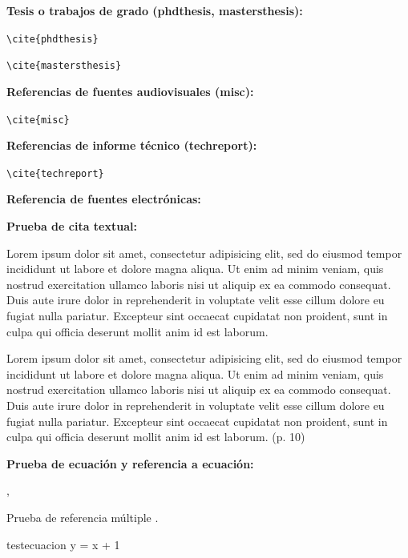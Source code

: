 \espaciodoble\textbf{Tesis o trabajos de grado (phdthesis, mastersthesis):}

\verb;\cite{phdthesis}; \cite{phdthesis}

\verb;\cite{mastersthesis}; \cite{mastersthesis}

\espaciodoble\textbf{Referencias de fuentes audiovisuales (misc):}

\verb;\cite{misc}; \cite{misc}

\espaciodoble\textbf{Referencias de informe técnico (techreport):}

\verb;\cite{techreport}; \cite{techreport}

\espaciodoble\textbf{Referencia de fuentes electrónicas:}

\cite{causa2007computacion}

\break

\espaciodoble\textbf{Prueba de cita textual:}

Lorem ipsum dolor sit amet, consectetur adipisicing elit, sed do eiusmod tempor incididunt ut labore et dolore magna aliqua. Ut enim ad minim veniam, quis nostrud exercitation ullamco laboris nisi ut aliquip ex ea commodo consequat. Duis aute irure dolor in reprehenderit in voluptate velit esse cillum dolore eu fugiat nulla pariatur. Excepteur sint occaecat cupidatat non proident, sunt in culpa qui officia deserunt mollit anim id est laborum.

\begin{citatextual}
Lorem ipsum dolor sit amet, consectetur adipisicing elit, sed do eiusmod tempor incididunt ut labore et dolore magna aliqua. Ut enim ad minim veniam, quis nostrud exercitation ullamco laboris nisi ut aliquip ex ea commodo consequat. Duis aute irure dolor in reprehenderit in voluptate velit esse cillum dolore eu fugiat nulla pariatur. Excepteur sint occaecat cupidatat non proident, sunt in culpa qui officia deserunt mollit anim id est laborum.
(p. 10)
\end{citatextual}

\espaciodoble\textbf{Prueba de ecuación y referencia a ecuación:}

, 

Prueba de referencia múltiple  .

\begin{ecuacion}{testecuacion}
	y = x + 1
\end{ecuacion}

